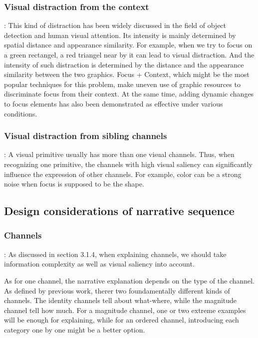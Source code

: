 \subsubsection{Visual distraction from the context}: This kind of distraction has been widely discussed in the field of object detection and human visual attention. \cite{nothdurft_salience_2000, standage_modelling_2005}Its intensity is mainly  determined by spatial distance and appearance similarity. \cite{wolfe_guided_1994}For example, when we try to focus on a green rectangel, a red triangel near by it can lead to visual distraction. And the intensity of such distraction is determined by the distance and the appearance similarity between the two graphics. Focus + Context, which might be the most popular techniques for this problem, make uneven use of graphic resources to discriminate focus from their context. At the same time, adding dynamic changes to focus elements has also been demonstrated as effective under various conditions\cite{waldner_attractive_2014}. 

\subsubsection{Visual distraction from sibling channels}: A visual primitive usually has more than one visual channels. Thus, when recognizing one primitive, the channels with high visual saliency can significantly influence the expression of other channels. For example, color can be a strong noise when focus is supposed to be the shape.

\subsection{Design considerations of narrative sequence}
\subsubsection{Channels}: As discussed in section 3.1.4, when explaining channels, we should take information complexity as well as visual saliency into account. 

As for one channel, the narrative explanation depends on the type of the channel. As defined by previous work, therer two foundamentally different kinds of channels. The identity channels tell about what-where, while the magnitude channel tell how much. For a magnitude channel, one or two extreme examples will be enough for explaining, while for an ordered channel, introducing each category one by one might be a better option.\par
